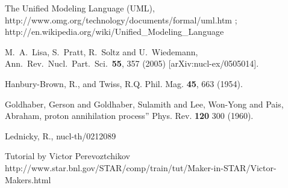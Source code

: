 \documentclass[twoside]{article}
\begin{document}
\begin{thebibliography}{99}

   The Unified Modeling Language (UML), 
   http://www.omg.org/technology/documents/formal/uml.htm ;
   http://en.wikipedia.org/wiki/Unified\_Modeling\_Language

  M.~A.~Lisa, S.~Pratt, R.~Soltz and U.~Wiedemann,
  Ann.\ Rev.\ Nucl.\ Part.\ Sci.\  {\bf 55}, 357 (2005)
  [arXiv:nucl-ex/0505014].

  Hanbury-Brown, R., and Twiss, R.Q.
  Phil. Mag. {\bf 45}, 663 (1954).

  Goldhaber, Gerson and Goldhaber, Sulamith and Lee, Won-Yong
                  and Pais, Abraham, 
                  proton  annihilation process''
  Phys. Rev. {\bf 120} 300 (1960).

   Lednicky, R.,
   nucl-th/0212089


Tutorial by Victor Perevoztchikov 
http://www.star.bnl.gov/STAR/comp/train/tut/Maker-in-STAR/Victor-Makers.html

\end{thebibliography}


%
%

\printindex
\end{document}
